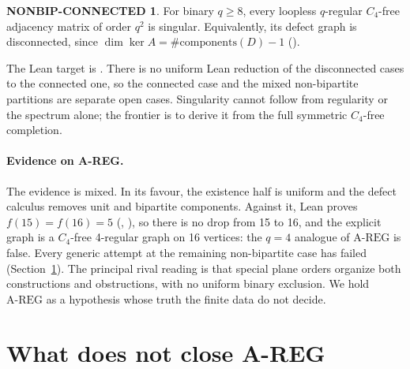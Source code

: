 \documentclass{anvil-paper}
\newcommand{\AREG}{\mathrm{A\text{-}REG}}
\theoremstyle{definition}
\newtheorem*{nonbipconn}{NONBIP-CONNECTED}
\begin{document}
\begin{nonbipconn}
For binary $q\ge 8$, every loopless $q$-regular $C_4$-free adjacency matrix of order $q^2$ is singular. Equivalently, its defect graph is disconnected, since $\dim\ker A=\#\mathrm{components}(D)-1$ ().
\end{nonbipconn}

\noindent The Lean target is . There is no uniform Lean reduction of the disconnected cases to the connected one, so the connected case and the mixed non-bipartite partitions are separate open cases. Singularity cannot follow from regularity or the spectrum alone; the frontier is to derive it from the full symmetric $C_4$-free completion.

\paragraph{Evidence on A-REG.} The evidence is mixed. In its favour, the existence half is uniform and the defect calculus removes unit and bipartite components. Against it, Lean proves $f(15)=f(16)=5$ (, ), so there is no drop from 15 to 16, and the explicit graph  is a $C_4$-free 4-regular graph on 16 vertices: the $q=4$ analogue of $\AREG$ is false. Every generic attempt at the remaining non-bipartite case has failed (Section~\ref{sec:negative}). The principal rival reading is that special plane orders organize both constructions and obstructions, with no uniform binary exclusion. We hold $\AREG$ as a hypothesis whose truth the finite data do not decide.

\section{What does not close A-REG}\label{sec:negative}
\end{document}
